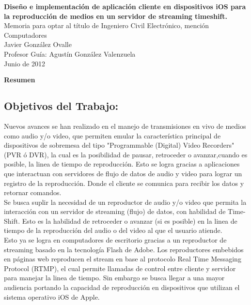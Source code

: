 \newpage
\thispagestyle{empty}
\begin{center}
 \Large \textbf{Diseño e implementación de aplicación cliente en dispositivos iOS para la reproducción de medios en un servidor de streaming timeshift.}\\

\normalsize Memoria para optar al título de Ingeniero Civil Electrónico, mención Computadores \\
\normalsize Javier González Ovalle \\
\normalsize Profesor Guía: Agustín González Valenzuela \\
\normalsize Junio de 2012

\Large \textbf{Resumen}

\end{center}
\normalsize
\subsection*{Objetivos del Trabajo:}
\normalsize

Nuevos avances se han realizado en el manejo de transmisiones en vivo de medios como audio y/o video, que permiten emular la característica principal de dispositivos de sobremesa del tipo "Programmable (Digital) Video Recorders" (PVR ó DVR), la cual es la posibilidad de pausar, retroceder o avanzar,cuando es posible, la linea de tiempo de reproducción. Esto se logra gracias a aplicaciones que interactuan con servidores de flujo de datos de audio y video para lograr un registro de la reproducción. Donde el cliente se comunica para recibir los datos y retornar comandos.\\ 

Se busca suplir la necesidad de un reproductor de audio y/o video que permita la interacción con un servidor de streaming (flujo) de datos, con habilidad de Time-Shift. Esto es la habilidad de retroceder o avanzar (si es posible) en la linea de tiempo de la reproducción del audio o del video al que el usuario atiende.\\

Esto ya se logra en computadores de escritorio gracias a un reproductor de streaming basado en la tecnolog\'ia Flash de Adobe. Los reproductores embebidos en p\'aginas web reproducen el stream en base al protocolo Real Time Messaging Protocol (RTMP), el cual permite llamadas de control entre cliente y servidor para manejar la linea de tiempo. Sin embargo se busca llegar a una mayor audiencia portando la capacidad de reproducci\'on en dispositivos que utilizan el sistema operativo iOS de Apple.\\

